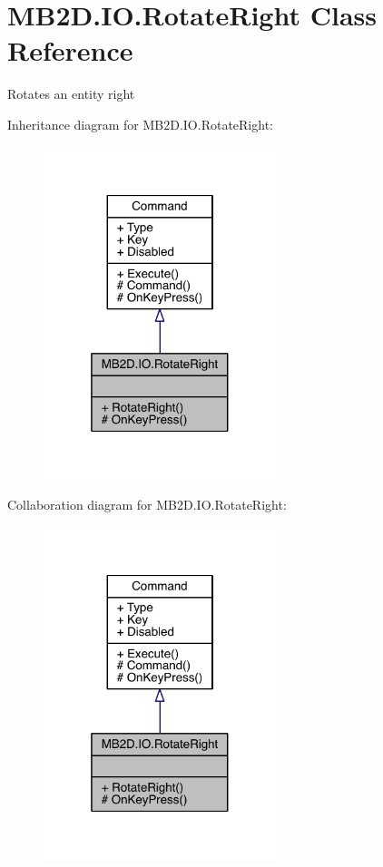 \hypertarget{class_m_b2_d_1_1_i_o_1_1_rotate_right}{}\section{M\+B2\+D.\+I\+O.\+Rotate\+Right Class Reference}
\label{class_m_b2_d_1_1_i_o_1_1_rotate_right}


Rotates an entity right  




Inheritance diagram for M\+B2\+D.\+I\+O.\+Rotate\+Right\+:\nopagebreak
\begin{figure}[H]
\begin{center}
\leavevmode
\includegraphics[width=193pt]{class_m_b2_d_1_1_i_o_1_1_rotate_right__inherit__graph}
\end{center}
\end{figure}


Collaboration diagram for M\+B2\+D.\+I\+O.\+Rotate\+Right\+:\nopagebreak
\begin{figure}[H]
\begin{center}
\leavevmode
\includegraphics[width=193pt]{class_m_b2_d_1_1_i_o_1_1_rotate_right__coll__graph}
\end{center}
\end{figure}
